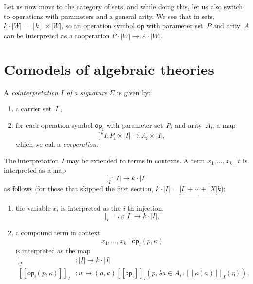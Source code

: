 \documentclass{amsart}
\newcommand{\lam}[1]{\lambda #1 \,.\,}
\newcommand{\op}[1]{\mathsf{op}_{#1}} %
\newcommand{\sem}[1]{[\![#1]\!]} %
\begin{document}
Let us now move to the category of sets, and while doing this, let us also switch to operations with parameters and a general arity. We see that in sets, $k \cdot |W| = [k] \times |W|$, so an operation symbol $\op{}$ with parameter set~$P$ and arity~$A$ can be interpreted as a cooperation $P \cdot |W| \to A \cdot |W|$.

\section{Comodels of algebraic theories}
\label{sec:comodels}

A \emph{cointerpretation $I$ of a signature $\Sigma$} is given by:
%
\begin{enumerate}
\item a carrier set $|I|$,
\item for each operation symbol $\op{i}$ with parameter set~$P_i$ and arity~$A_i$,
  a map
  \begin{equation*}
    \sem{\op{i}}^kI : P_i \times |I| \longrightarrow A_i \times |I|,
  \end{equation*}
  which we call a \emph{cooperation}.
\end{enumerate}
%
The interpretation $I$ may be extended to terms in contexts. A term
$x_1, \ldots, x_k \mid t$ is interpreted as a map
%
\begin{equation*}
  \sem{x_1, \ldots, x_k \mid t}_I : |I| \to k \cdot |I|
\end{equation*}
%
as follows (for those that skipped the first section, $k \cdot |I| = \underbrace{|I| + \cdots + |X|}k$):
%
\begin{enumerate}
\item the variable $x_i$ is interpreted as the $i$-th injection,
  \begin{equation*}
    \sem{x_0, \ldots, x_{k-1} \mid  x_i}_I = \iota_i : |I| \to k \cdot |I|,
  \end{equation*}
\item a compound term in context
  \begin{equation*}
    x_1, \ldots, x_k \mid \op{i}(p, \kappa)
  \end{equation*}
  is interpreted as the map
  \begin{align*}
    \sem{\op{i}(p, \kappa)}_I &: |I| \longrightarrow k \cdot |I| \\
    \sem{\op{i}(p, \kappa)}_I &:
      w \mapsto (a, \kappa)
      \sem{\op{i}}_I(p, \lam{a \in A_i} \sem{\kappa(a)}_I(\eta)),
  \end{align*}
\end{enumerate}
\end{document}
